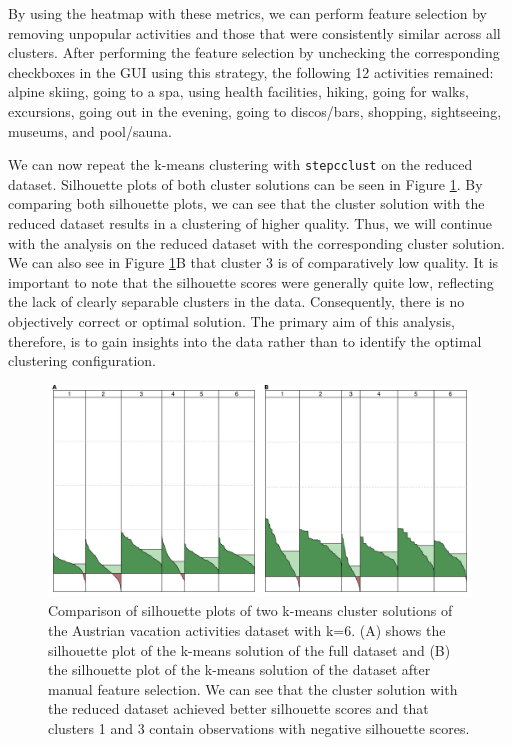 \documentclass[article]{ajs}
\begin{document}
By using the heatmap with these metrics, we can perform feature selection by removing unpopular activities and those that were consistently similar across all clusters. After performing the feature selection by unchecking the corresponding checkboxes in the GUI using this strategy, the following 12 activities remained: alpine skiing, going to a spa, using health facilities, hiking, going for walks, excursions, going out in the evening, going to discos/bars, shopping, sightseeing, museums, and pool/sauna.

We can now repeat the k-means clustering with \texttt{stepcclust} on the reduced dataset. Silhouette plots of both cluster solutions can be seen in Figure \ref{fig:silhouette_comparison}. By comparing both silhouette plots, we can see that the cluster solution with the reduced dataset results in a clustering of higher quality. Thus, we will continue with the analysis on the reduced dataset with the corresponding cluster solution. We can also see in Figure \ref{fig:silhouette_comparison}B that cluster 3 is of comparatively low quality. It is important to note that the silhouette scores were generally quite low, reflecting the lack of clearly separable clusters in the data. Consequently, there is no objectively correct or optimal solution. The primary aim of this analysis, therefore, is to gain insights into the data rather than to identify the optimal clustering configuration.

\begin{figure}[h!]
    \centering
    \includegraphics[width=1\textwidth]{silhouette_comparison.png}
    \caption{Comparison of silhouette plots of two k-means cluster solutions of the Austrian vacation activities dataset with k=6. (A) shows the silhouette plot of the k-means solution of the full dataset and (B) the silhouette plot of the k-means solution of the dataset after manual feature selection. We can see that the cluster solution with the reduced dataset achieved better silhouette scores and that clusters 1 and 3 contain observations with negative silhouette scores.}
    \label{fig:silhouette_comparison}
\end{figure}
\end{document}
